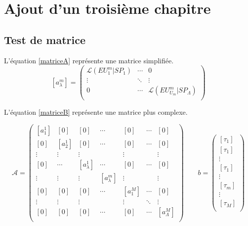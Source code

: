 \chapter{Ajout d'un troisième chapitre}

\section{Test de matrice}
    L'équation \ref{matriceA} représente une matrice simplifiée.
 	\begin{equation}
            \label{matriceA}
		[a^m_{\lambda}] = 
		\begin{pmatrix}
    		\mathcal{L}(EU^m_1|SP_1)    &\cdots       & 0 \\
                \vdots                      &\ddots       & \vdots    \\
                0                           &\cdots       & \mathcal{L}(EU^m_{U_m}|SP_{\Lambda})   \\ 
		\end{pmatrix} 
	\end{equation}
    
    L'équation \ref{matriceB} représente une matrice plus complexe.
    
    \begin{equation}
        \label{matriceB}
	\mathcal{A} = 
	\begin{pmatrix}
    	[a^1_1]     &[0]        & [0]       & \cdots           & [0]       & \cdots    & [0] \\ 
		[0]			& [a^1_2] 	& [0] 		& \cdots           & [0]	   &\cdots     & [0] \\
            \vdots  	& \vdots	& \vdots	&  			       & \vdots    &  	       & \vdots	\\ 
		[0] 		& \cdots 	& [a^1_{\lambda}] & \cdots     & [0]       &\cdots     & [0] \\
		\vdots  	& \vdots  	& \vdots  	&[a^m_{\lambda}]   & \vdots    &  		   & \vdots \\
		[0]  		& [0]  		& [0] 		& \cdots 	 	   & [a^M_1]   & \cdots    &[0] \\  
		\vdots  	& \vdots  	& \vdots    & 				   & \vdots    &  \ddots   & \vdots \\ 
 		[0] 			& [0] 		& [0] 		& \cdots 		   & [0] 	   & \cdots    &[a^M_{\Lambda}] \\ 
		\end{pmatrix}
		\qquad b = 
		\begin{pmatrix}
			[\tau_1]\\ 
			[\tau_1]\\ 
			\vdots \\ 
			[\tau_1]\\ 
			\vdots \\ 
			[\tau_m]\\ 
			\vdots \\
			[\tau_M]\\  
		\end{pmatrix}
    \end{equation}


